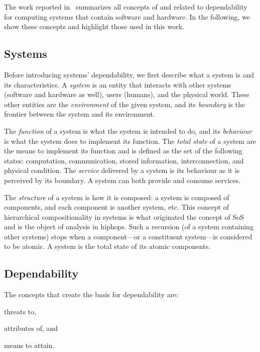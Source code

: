 \documentclass[12pt,openright,twoside,a4paper,oldfontcommands,english,brazil,final]{abntex2}
\theoremstyle{theo}
\begin{document}
The work reported in~\cite{ALR+2004} summarizes all concepts of and related to dependability for computing systems that contain software and hardware.
In the following, we show these concepts and highlight those used in this work.

\subsection{Systems}

Before introducing systems' dependability, we first describe what a system is and its characteristics.
A \emph{system} is an entity that interacts with other systems (software and hardware as well), users (humans), and the physical world.
These other entities are the \emph{environment} of the given system, and its \emph{boundary} is the frontier between the system and its environment.

The \emph{function} of a system is what the system is intended to do, and its \emph{behaviour} is what the system does to implement its function. 
The \emph{total state} of a system are the means to implement its function and is defined as the set of the following states: computation, communication, stored information, interconnection, and physical condition.
The \emph{service} delivered by a system is its behaviour as it is perceived by its boundary.
A system can both provide and consume services.

The \emph{structure} of a system is how it is composed: a system is composed of components, and each component is another system, etc.
This concept of hierarchical compositionality in systems is what originated the concept of \ac{SoS} and is the object of analysis in \ac{hiphops}.
Such a recursion (of a system containing other systems) stops when a component---or a constituent system---is considered to be atomic.
A system is the total state of its atomic components.

\subsection{Dependability}

The concepts that create the basis for dependability are:
\begin{alineasinline}
  \item threats to,
  \item attributes of, and
  \item means to attain.
\end{alineasinline}
\end{document}
